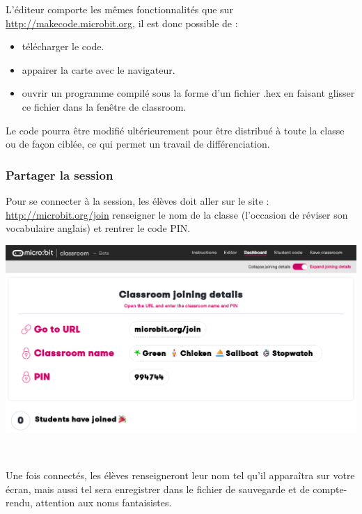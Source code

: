 \begin{remarque}
    L'éditeur comporte les mêmes fonctionnalités que sur \url{http://makecode.microbit.org}, il est donc possible de :
    \begin{itemize}
        \item télécharger le code.
        \item appairer la carte \mb avec le navigateur.
        \item ouvrir un programme compilé sous la forme d'un fichier .hex en faisant glisser ce fichier
        dans la fenêtre de classroom.
        
    \end{itemize}
    
    Le code pourra être modifié ultérieurement pour être distribué à toute la classe ou de façon ciblée,
     ce qui permet un travail de différenciation.
 
\end{remarque}

\vspace{5mm}

\subsubsection{Partager la session}

\begin{methode}
    Pour se connecter à la session, les élèves doit aller sur le site :  \url{http://microbit.org/join}
     renseigner le nom de la classe (l'occasion de réviser son vocabulaire anglais)
    et rentrer le code PIN.
    \vspace{5mm}

    \centerline{\includegraphics[width=0.6\linewidth]{res/classroom_dashboard2.png}}
    
\end{methode}


\newpage
\vspace{5mm}\\

\begin{remarque}
    Une fois connectés, les élèves renseigneront leur nom tel qu'il apparaîtra sur votre écran,
    mais aussi tel sera enregistrer dans le fichier de sauvegarde et de compte-rendu, attention
    aux noms fantaisistes.
    
\end{remarque}

